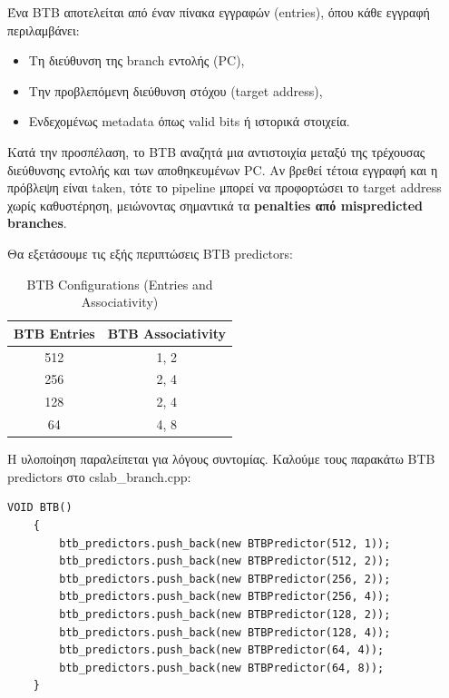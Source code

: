 \documentclass{article}
\begin{document}
Ένα BTB αποτελείται από έναν πίνακα εγγραφών (entries), όπου κάθε εγγραφή περιλαμβάνει:
\begin{itemize}
    \item Τη διεύθυνση της branch εντολής (PC),
    \item Την προβλεπόμενη διεύθυνση στόχου (target address),
    \item Ενδεχομένως metadata όπως valid bits ή ιστορικά στοιχεία.
\end{itemize}

Κατά την προσπέλαση, το BTB αναζητά μια αντιστοιχία μεταξύ της τρέχουσας διεύθυνσης εντολής και των αποθηκευμένων PC. Αν βρεθεί τέτοια εγγραφή και η πρόβλεψη είναι taken, τότε το pipeline μπορεί να προφορτώσει το target address χωρίς καθυστέρηση, μειώνοντας σημαντικά τα \textbf{penalties από mispredicted branches}.

Θα εξετάσουμε τις εξής περιπτώσεις BTB predictors:

\begin{table}[H]
    \centering
    \begin{tabular}{|c|c|}
    \hline
    \textbf{BTB Entries} & \textbf{BTB Associativity} \\
    \hline
    512 & 1, 2 \\
    \hline
    256 & 2, 4 \\
    \hline
    128 & 2, 4 \\
    \hline
    64  & 4, 8 \\
    \hline
    \end{tabular}
    \caption{BTB Configurations (Entries and Associativity)}
    \label{table:btb_configs}
\end{table}

Η υλοποίηση παραλείπεται για λόγους συντομίας.
Καλούμε τους παρακάτω BTB predictors στο cslab\_branch.cpp:
\begin{lstlisting}[style=cppstyle]
    VOID BTB()
    {
        btb_predictors.push_back(new BTBPredictor(512, 1));
        btb_predictors.push_back(new BTBPredictor(512, 2));
        btb_predictors.push_back(new BTBPredictor(256, 2));
        btb_predictors.push_back(new BTBPredictor(256, 4));
        btb_predictors.push_back(new BTBPredictor(128, 2));
        btb_predictors.push_back(new BTBPredictor(128, 4));
        btb_predictors.push_back(new BTBPredictor(64, 4));
        btb_predictors.push_back(new BTBPredictor(64, 8));
    }
\end{lstlisting}
\end{document}
